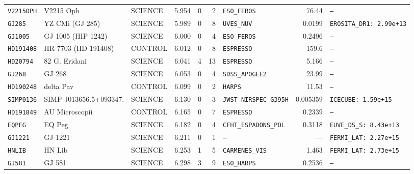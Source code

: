 \documentclass[twocolumn,10pt]{article}
\begin{document}
\begin{table}[!ht]
{\begin{tabular}{llllrrlrl}
\texttt{V2215OPH} & V2215 Oph & SCIENCE & 5.954 & 0 & 2 & \texttt{ESO\_FEROS} & 76.44 & \texttt{---} \\
\texttt{GJ285} & YZ CMi (GJ 285) & SCIENCE & 5.989 & 0 & 8 & \texttt{UVES\_NUV} & 0.0199 & \texttt{EROSITA\_DR1: 2.99e+13} \\
\texttt{GJ1005} & GJ 1005 (HIP 1242) & SCIENCE & 6.000 & 0 & 4 & \texttt{ESO\_FEROS} & 0.2496 & \texttt{---} \\
\texttt{HD191408} & HR 7703 (HD 191408) & CONTROL & 6.012 & 0 & 8 & \texttt{ESPRESSO} & 159.6 & \texttt{---} \\
\texttt{HD20794} & 82 G. Eridani & SCIENCE & 6.041 & 4 & 13 & \texttt{ESPRESSO} & 5.166 & \texttt{---} \\
\texttt{GJ268} & GJ 268 & SCIENCE & 6.053 & 0 & 4 & \texttt{SDSS\_APOGEE2} & 23.99 & \texttt{---} \\
\texttt{HD190248} & delta Pav & CONTROL & 6.099 & 0 & 2 & \texttt{HARPS} & 11.53 & \texttt{---} \\
\texttt{SIMP0136} & SIMP J013656.5+093347. & SCIENCE & 6.130 & 0 & 3 & \texttt{JWST\_NIRSPEC\_G395H} & 0.005359 & \texttt{ICECUBE: 1.59e+15} \\
\texttt{HD191849} & AU Microscopii & CONTROL & 6.165 & 0 & 7 & \texttt{ESPRESSO} & 0.2339 & \texttt{---} \\
\texttt{EQPEG} & EQ Peg & SCIENCE & 6.182 & 0 & 4 & \texttt{CFHT\_ESPADONS\_POL} & 0.3118 & \texttt{EUVE\_DS\_S: 8.43e+13} \\
\texttt{GJ1221} & GJ 1221 & SCIENCE & 6.211 & 0 & 1 & \texttt{---} & --- & \texttt{FERMI\_LAT: 2.27e+15} \\
\texttt{HNLIB} & HN Lib & SCIENCE & 6.253 & 1 & 5 & \texttt{CARMENES\_VIS} & 1.463 & \texttt{FERMI\_LAT: 2.73e+15} \\
\texttt{GJ581} & GJ 581 & SCIENCE & 6.298 & 3 & 9 & \texttt{ESO\_HARPS} & 0.2536 & \texttt{---} \\
\bottomrule
\end{tabular}%
}
\end{table}
\clearpage
\end{document}
